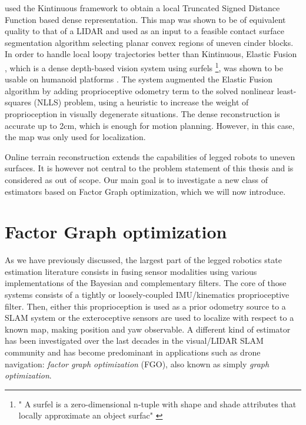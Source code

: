 \cite{fallon2015continuous} used the Kintinuous framework \cite{whelan2012kintinuous} to obtain a local Truncated Signed Distance Function based dense representation. This map was
shown to be of equivalent quality to that of a LIDAR and used as an input to a feasible contact surface segmentation algorithm selecting planar convex regions of uneven cinder blocks. 
In order to handle local loopy trajectories better than Kintinuous, Elastic Fusion \cite{whelan2016elasticfusion}, which is a dense depth-based vision system using surfels \footnote{"
A surfel is a zero-dimensional n-tuple with shape and shade attributes that locally approximate an object surfac" \cite{pfister2000surfels}}, 
was shown to be usable on humanoid platforms \cite{scona2017direct}. The system augmented the Elastic Fusion algorithm by adding 
proprioceptive odometry term to the solved nonlinear least-squares (NLLS) problem, using a heuristic to increase the weight of proprioception in visually degenerate situations. The 
dense reconstruction is accurate up to 2cm, which is enough for motion planning. However, in this case, the map was only used for localization.

Online terrain reconstruction extends the capabilities of legged robots to uneven surfaces. It is however not central to the problem statement of this thesis and is considered as
out of scope. Our main goal is to investigate a new class of estimators based on Factor Graph optimization, which we will now introduce. 


\section{Factor Graph optimization}
\label{sec:sota_factor_graph}
As we have previously discussed, the largest part of the legged robotics state estimation literature consists in fusing sensor modalities using various 
implementations of the Bayesian and complementary filters. The core of those systems consists of a tightly or loosely-coupled IMU/kinematics proprioceptive
filter. Then, either this proprioception is used as a prior odometry source to a SLAM system or the exteroceptive sensors are used to localize 
with respect to a known map, making position and yaw observable.
A different kind of estimator has been investigated over the last decades in the visual/LIDAR SLAM community and has become predominant in applications
such as drone navigation: \textit{factor graph optimization} (FGO), also known as simply \textit{graph optimization}. 

